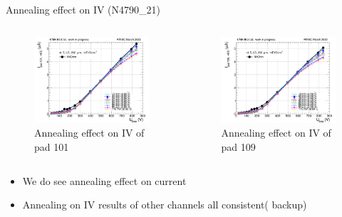 \documentclass{beamer}
\begin{document}
\begin{frame}{ Annealing effect on IV (N4790\_21)}
   \begin{columns}
        \begin{figure}
            \includegraphics[width=1.0\textwidth]{plots/annealing_IV_ch101_N4790_21.png}
            \caption{Annealing effect on IV of pad 101}
        \end{figure}
        \begin{figure}
            \includegraphics[width=1.0\textwidth]{plots/8in_198ch_2019_N4790_21_4E15_neg40degC_annealing_IV_ch109.png}
            \caption{Annealing effect on IV of pad 109}
        \end{figure}
    \end{columns}
    \begin{itemize}
        \item We do see annealing effect on current
        \item Annealing on IV results of other channels all consistent( backup)
    \end{itemize}
\end{frame}
\end{document}
